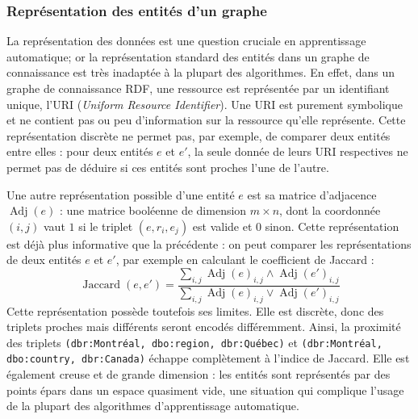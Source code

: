 \subsubsection{Représentation des entités d'un graphe}
\newcommand{\URI}{\operatorname{URI}}
\newcommand{\Adja}{\operatorname{Adj}}

La représentation des données est une question cruciale en apprentissage automatique; or la représentation standard des entités dans un graphe de connaissance est très inadaptée à la plupart des algorithmes. En effet, dans un graphe de connaissance RDF, une ressource est représentée par un identifiant unique, l'URI (\textit{Uniform Resource Identifier}). 
Une URI est purement symbolique et ne contient pas ou peu d'information sur la ressource qu'elle représente. Cette représentation discrète ne permet pas, par exemple, de comparer deux entités entre elles : pour deux entités $e$ et $e'$, la seule donnée de leurs URI respectives ne permet pas de déduire si ces entités sont proches l'une de l'autre. %

Une autre représentation possible d'une entité $e$ est sa matrice d'adjacence $\Adja(e)$ : une matrice booléenne de dimension $m \times n$, dont la coordonnée $(i, j)$ vaut $1$ si le triplet $(e, r_i, e_j)$ est valide et $0$ sinon. Cette représentation est déjà plus informative que la précédente : on peut comparer les représentations de deux entités $e$ et $e'$, par exemple en calculant le coefficient de Jaccard :
\begin{equation}
    \operatorname{Jaccard}(e, e') = \frac{\sum_{i, j} \Adja(e)_{i, j} \land \Adja(e')_{i, j}}{\sum_{i, j} \Adja(e)_{i, j} \lor \Adja(e')_{i, j}}    
\end{equation}
Cette représentation possède toutefois ses limites. Elle est discrète, donc des triplets proches mais différents seront encodés différemment. Ainsi, la proximité des triplets \texttt{(dbr:Montréal, dbo:region, dbr:Québec)} et \texttt{(dbr:Montréal, dbo:country, dbr:Canada)} échappe complètement à l'indice de Jaccard. Elle est également creuse et de grande dimension : les entités sont représentés par des points épars dans un espace quasiment vide, une situation qui complique l'usage de la plupart des algorithmes d'apprentissage automatique.


